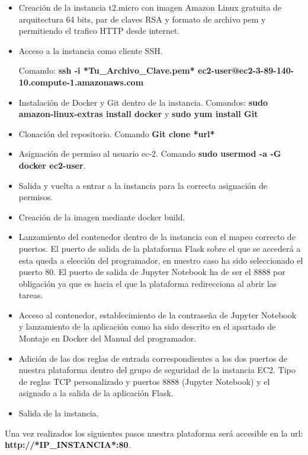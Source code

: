 \begin{itemize}
\item Creación de la instancia t2.micro con imagen Amazon Linux gratuita de arquitectura 64 bits, par de claves RSA y formato de archivo pem y permitiendo el trafico HTTP desde internet.

\item Acceso a la instancia como cliente SSH. 

Comando: \textbf{ssh -i *Tu\_Archivo\_Clave.pem* ec2-user@ec2-3-89-140-10.compute-1.amazonaws.com}

\item Instalación de Docker y Git dentro de la instancia. Comandos: \textbf{sudo amazon-linux-extras install docker} y \textbf{sudo yum install Git}

\item Clonación del repositorio. Comando \textbf{Git clone *url*}

\item Asignación de permiso al usuario ec-2. Comando \textbf{sudo usermod -a -G docker ec2-user}.

\item Salida y vuelta a entrar a la instancia para la correcta asignación de permisos.

\item Creación de la imagen mediante docker build.

\item Lanzamiento del contenedor dentro de la instancia con el mapeo correcto de puertos. El puerto de salida de la plataforma Flask sobre el que se accederá a esta queda a elección del programador, en nuestro caso ha sido seleccionado el puerto 80. El puerto de salida de Jupyter Notebook ha de ser el 8888 por obligación ya que es hacia el que la plataforma redirecciona al abrir las tareas. 

\item Acceso al contenedor, establecimiento de la contraseña de Jupyter Notebook y lanzamiento de la aplicación como ha sido descrito en el apartado de Montaje en Docker del Manual del programador.

\item Adición de las dos reglas de entrada correspondientes a los dos puertos de nuestra plataforma dentro del grupo de seguridad de la instancia EC2. Tipo de reglas TCP personalizado y puertos 8888 (Jupyter Notebook) y el asignado a la salida de la aplicación Flask.

\item Salida de la instancia.
\end{itemize}

Una vez realizados los siguientes pasos nuestra plataforma será accesible en la url: \textbf{http://*IP\_INSTANCIA*:80}.